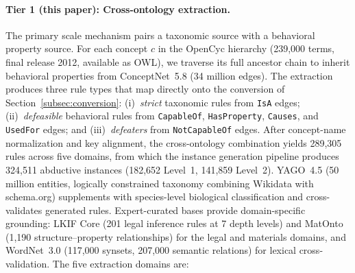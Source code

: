 \documentclass{article}
\theoremstyle{definition}
\begin{document}
\paragraph{Tier 1 (this paper): Cross-ontology extraction.}
The primary scale mechanism pairs a taxonomic source with a behavioral property source. For each concept $c$ in the OpenCyc hierarchy \cite{lenat1995cyc} (239,000 terms, final release 2012, available as OWL), we traverse its full ancestor chain to inherit behavioral properties from ConceptNet~5.8 \cite{speer2017conceptnet} (34 million edges). The extraction produces three rule types that map directly onto the conversion of Section~\ref{subsec:conversion}: (i)~\emph{strict} taxonomic rules from \texttt{IsA} edges; (ii)~\emph{defeasible} behavioral rules from \texttt{CapableOf}, \texttt{HasProperty}, \texttt{Causes}, and \texttt{UsedFor} edges; and (iii)~\emph{defeaters} from \texttt{NotCapableOf} edges. After concept-name normalization and key alignment, the cross-ontology combination yields 289,305 rules across five domains, from which the instance generation pipeline produces 324,511 abductive instances (182,652 Level~1, 141,859 Level~2). YAGO~4.5 \cite{suchanek2024yago} (50 million entities, logically constrained taxonomy combining Wikidata with schema.org) supplements with species-level biological classification and cross-validates generated rules. Expert-curated bases provide domain-specific grounding: LKIF Core \cite{lkif2007} (201 legal inference rules at 7 depth levels) and MatOnto \cite{matonto2015} (1,190 structure--property relationships) for the legal and materials domains, and WordNet~3.0 \cite{miller1995wordnet} (117,000 synsets, 207,000 semantic relations) for lexical cross-validation. The five extraction domains are:
\end{document}
